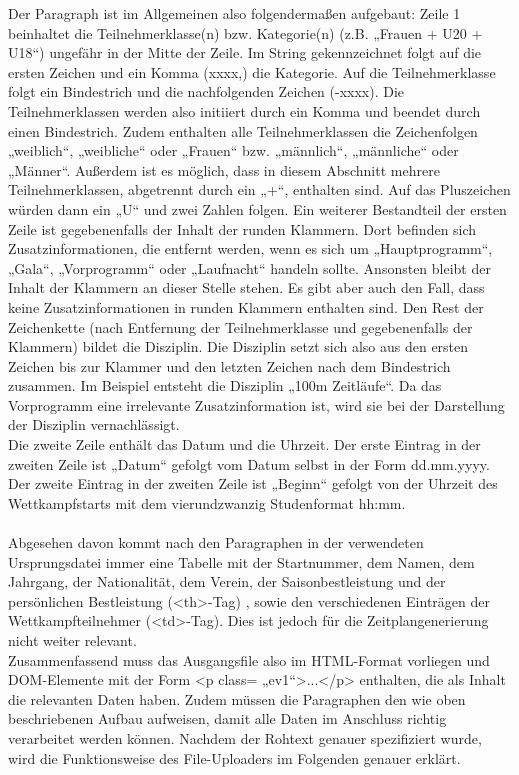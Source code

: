 {Der Paragraph ist im Allgemeinen also folgendermaßen aufgebaut:
Zeile 1 beinhaltet die Teilnehmerklasse(n) bzw. Kategorie(n) (z.B. „Frauen + U20 + U18“) ungefähr in der Mitte der Zeile. Im String gekennzeichnet folgt auf die ersten Zeichen und ein Komma (xxxx,) die Kategorie. Auf die Teilnehmerklasse folgt ein Bindestrich und die nachfolgenden Zeichen (-xxxx). Die Teilnehmerklassen werden also initiiert durch ein Komma und beendet durch einen Bindestrich. Zudem enthalten alle Teilnehmerklassen die Zeichenfolgen „weiblich“, „weibliche“ oder „Frauen“ bzw. „männlich“, „männliche“ oder „Männer“. Außerdem ist es möglich, dass in diesem Abschnitt mehrere Teilnehmerklassen, abgetrennt durch ein „+“, enthalten sind. Auf das Pluszeichen würden dann ein „U“ und zwei Zahlen folgen. Ein weiterer Bestandteil der ersten Zeile ist gegebenenfalls der Inhalt der runden Klammern. Dort befinden sich Zusatzinformationen, die entfernt werden, wenn es sich um „Hauptprogramm“, „Gala“, „Vorprogramm“ oder „Laufnacht“ handeln sollte. Ansonsten bleibt der Inhalt der Klammern an dieser Stelle stehen. Es gibt aber auch den Fall, dass keine Zusatzinformationen in runden Klammern enthalten sind. Den Rest der Zeichenkette (nach Entfernung der Teilnehmerklasse und gegebenenfalls der Klammern) bildet die Disziplin. Die Disziplin setzt sich also aus den ersten Zeichen bis zur Klammer und den letzten Zeichen nach dem Bindestrich zusammen. Im Beispiel entsteht die Disziplin „100m Zeitläufe“. Da das Vorprogramm eine irrelevante Zusatzinformation ist, wird sie bei der Darstellung der Disziplin vernachlässigt.
\\
Die zweite Zeile enthält das Datum und die Uhrzeit. Der erste Eintrag in der zweiten Zeile ist „Datum“ gefolgt vom Datum selbst in der Form dd.mm.yyyy. Der zweite Eintrag in der zweiten Zeile ist „Beginn“ gefolgt von der Uhrzeit des Wettkampfstarts mit dem vierundzwanzig Studenformat hh:mm.\\
\\
Abgesehen davon kommt nach den Paragraphen in der verwendeten Ursprungsdatei immer eine Tabelle mit der Startnummer, dem Namen, dem Jahrgang, der Nationalität, dem Verein, der Saisonbestleistung und der persönlichen Bestleistung (<th>-Tag) , sowie den verschiedenen Einträgen der Wettkampfteilnehmer (<td>-Tag). Dies ist jedoch für die Zeitplangenerierung nicht weiter relevant.\\
Zusammenfassend muss das Ausgangsfile also im HTML-Format vorliegen und DOM-Elemente mit der Form <p class= „ev1“>...</p> enthalten, die als Inhalt die relevanten Daten haben. Zudem müssen die Paragraphen den wie oben beschriebenen Aufbau aufweisen, damit alle Daten im Anschluss richtig verarbeitet werden können. 
Nachdem der Rohtext genauer spezifiziert wurde, wird die Funktionsweise des File-Uploaders im Folgenden genauer erklärt.

}
